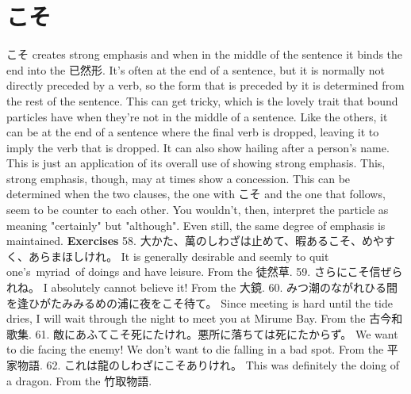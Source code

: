 \section{こそ}
   こそ creates strong emphasis and when in the middle of the sentence it binds the end into the 已然形. It's often at the end of a sentence, but it is normally not directly preceded by a verb, so the form that is preceded by it is determined from the rest of the sentence. This can get tricky, which is the lovely trait that bound particles have when they're not in the middle of a sentence.   Like the others, it can be at the end of a sentence where the final verb is dropped, leaving it to imply the verb that is dropped. It can also show hailing after a person's name. This is just an application of its overall use of showing strong emphasis. This, strong emphasis, though, may at times show a concession. This can be determined when the two clauses, the one with こそ and the one that follows, seem to be counter to each other. You wouldn't, then, interpret the particle as meaning "certainly" but "although". Even still, the same degree of emphasis is maintained.  \textbf{Exercises } 58. 大かた、萬のしわざは止めて、暇あるこそ、めやすく、あらまほしけれ。 \hfill\break
It is generally desirable and seemly to quit one's myriad of doings and have leisure. \hfill\break
From the 徒然草.  59. さらにこそ信ぜられね。 \hfill\break
I absolutely cannot believe it! \hfill\break
From the 大鏡.  60. みつ潮のながれひる間を逢ひがたみみるめの浦に夜をこそ待て。 \hfill\break
Since meeting is hard until the tide dries, I will wait through the night to meet you at Mirume Bay. \hfill\break
From the 古今和歌集.  61. 敵にあふてこそ死にたけれ。悪所に落ちては死にたからず。 \hfill\break
We want to die facing the enemy! We don't want to die falling in a bad spot. \hfill\break
From the 平家物語.  62. これは龍のしわざにこそありけれ。 \hfill\break
This was definitely the doing of a dragon. \hfill\break
From the 竹取物語.     